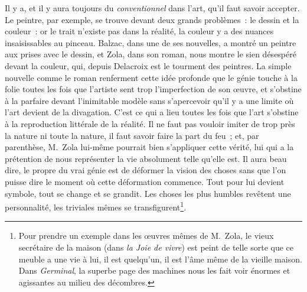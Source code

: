 \documentclass[french,twoside]{book} %
\begin{document}
Il y a, et il y aura toujours du \emph{conventionnel} dans l’art, qu’il faut savoir accepter. Le peintre, par exemple, se trouve devant deux grands problèmes : le dessin et la couleur : or le trait n’existe pas dans la réalité, la couleur y a des nuances insaisissables au pinceau. Balzac, dans une de ses nouvelles, a montré un peintre aux prises avec le dessin, et Zola, dans son roman, nous montre le sien désespéré devant la couleur, qui, depuis Delacroix est le tourment des peintres. La simple nouvelle comme le roman renferment cette idée profonde que le génie touche à la folie toutes les fois que l’artiste sent trop l’imperfection de son œuvre, et s’obstine à la parfaire devant l’inimitable modèle sans s’apercevoir qu’il y a une limite où l’art devient de la divagation. C’est ce qui a lieu toutes les fois que l’art s’obstine à la reproduction littérale de la réalité. Il ne faut pas vouloir imiter de trop près la nature ni toute la nature, il faut savoir faire la part du feu ; et, par parenthèse, M. Zola lui-même pourrait bien s’appliquer cette vérité, lui qui a la prétention de nous représenter la vie absolument telle qu’elle est. Il aura beau dire, le propre du vrai génie est de déformer la vision des choses sans que l’on puisse dire le moment où cette déformation commence. Tout pour lui devient symbole, tout se change et se grandit. Les choses les plus humbles revêtent une personnalité, les triviales mêmes se transfigurent\footnote{ Pour prendre un exemple dans les œuvres mêmes de M. Zola, le vieux secrétaire de la maison (dans \emph{la Joie de vivre}) est peint de telle sorte que ce meuble a une vie à lui, il est quelqu’un, il est l’âme même de la vieille maison. Dans \emph{Germinal}, la superbe page des machines nous les fait voir énormes et agissantes au milieu des décombres.}.
\end{document}
